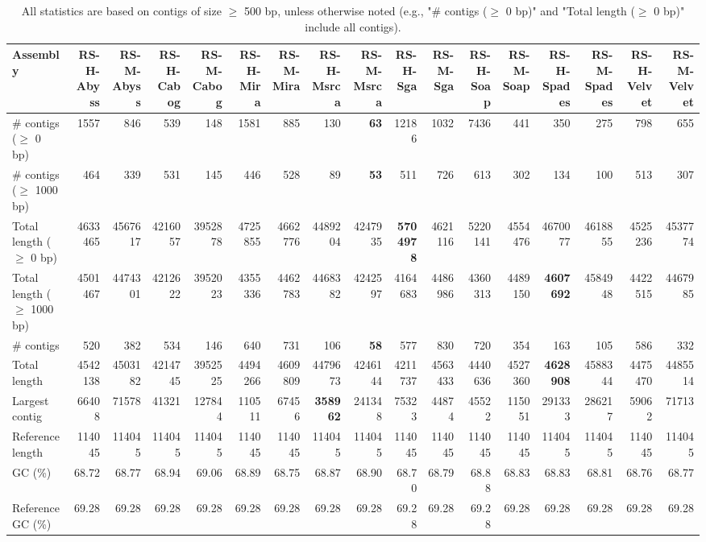 \documentclass[12pt,a4paper]{article}
\begin{document}
\begin{table}[ht]
\begin{center}
\caption{All statistics are based on contigs of size $\geq$ 500 bp, unless otherwise noted (e.g., "\# contigs ($\geq$ 0 bp)" and "Total length ($\geq$ 0 bp)" include all contigs).}
\begin{tabular}{|l*{16}{|r}|}
\hline
Assembly & RS-H-Abyss & RS-M-Abyss & RS-H-Cabog & RS-M-Cabog & RS-H-Mira & RS-M-Mira & RS-H-Msrca & RS-M-Msrca & RS-H-Sga & RS-M-Sga & RS-H-Soap & RS-M-Soap & RS-H-Spades & RS-M-Spades & RS-H-Velvet & RS-M-Velvet \\ \hline
\# contigs ($\geq$ 0 bp) & 1557 & 846 & 539 & 148 & 1581 & 885 & 130 & {\bf 63} & 12186 & 1032 & 7436 & 441 & 350 & 275 & 798 & 655 \\ \hline
\# contigs ($\geq$ 1000 bp) & 464 & 339 & 531 & 145 & 446 & 528 & 89 & {\bf 53} & 511 & 726 & 613 & 302 & 134 & 100 & 513 & 307 \\ \hline
Total length ($\geq$ 0 bp) & 4633465 & 4567617 & 4216057 & 3952878 & 4725855 & 4662776 & 4489204 & 4247935 & {\bf 5704978} & 4621116 & 5220141 & 4554476 & 4670077 & 4618855 & 4525236 & 4537774 \\ \hline
Total length ($\geq$ 1000 bp) & 4501467 & 4474301 & 4212622 & 3952023 & 4355336 & 4462783 & 4468382 & 4242597 & 4164683 & 4486986 & 4360313 & 4489150 & {\bf 4607692} & 4584948 & 4422515 & 4467985 \\ \hline
\# contigs & 520 & 382 & 534 & 146 & 640 & 731 & 106 & {\bf 58} & 577 & 830 & 720 & 354 & 163 & 105 & 586 & 332 \\ \hline
Total length & 4542138 & 4503182 & 4214745 & 3952525 & 4494266 & 4609809 & 4479673 & 4246144 & 4211737 & 4563433 & 4440636 & 4527360 & {\bf 4628908} & 4588344 & 4475470 & 4485514 \\ \hline
Largest contig & 66408 & 71578 & 41321 & 127844 & 110511 & 67456 & {\bf 358962} & 241348 & 75323 & 44874 & 45522 & 115051 & 291333 & 286217 & 59062 & 71713 \\ \hline
Reference length & 114045 & 114045 & 114045 & 114045 & 114045 & 114045 & 114045 & 114045 & 114045 & 114045 & 114045 & 114045 & 114045 & 114045 & 114045 & 114045 \\ \hline
GC (\%) & 68.72 & 68.77 & 68.94 & 69.06 & 68.89 & 68.75 & 68.87 & 68.90 & 68.70 & 68.79 & 68.88 & 68.83 & 68.83 & 68.81 & 68.76 & 68.77 \\ \hline
Reference GC (\%) & 69.28 & 69.28 & 69.28 & 69.28 & 69.28 & 69.28 & 69.28 & 69.28 & 69.28 & 69.28 & 69.28 & 69.28 & 69.28 & 69.28 & 69.28 & 69.28 \\ \hline

\end{tabular}
\end{center}
\end{table}
\end{document}
